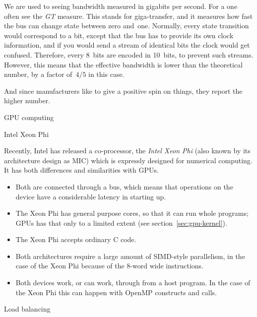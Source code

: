  We are used to seeing bandwidth
measured in gigabits per second. For a  one often
see the \emph{GT} measure. This stands
for giga-transfer, and it measures how fast the bus can change state
between zero and~one.
Normally, every state transition would correspond to a bit, except that
the bus has to provide its own clock information, and if you would send a stream
of identical bits the clock would get confused. Therefore, every 8~bits
are encoded in 10~bits, to prevent such streams. However, this means
that the effective bandwidth is lower than the theoretical number,
by a factor of~$4/5$ in this case.

And since manufacturers like to give a positive spin on things,
they report the higher number.

 {GPU computing}
\label{sec:gpu}


 {Intel Xeon Phi}

Recently, Intel has released a co-processor, the \emph{Intel Xeon Phi}
(also known by its architecture design as \ac{MIC})
which is expressly designed for numerical computing.
It has both differences and similarities with \acp{GPU}.
\begin{itemize}
\item Both are connected through a  bus, which means
  that operations on the device have a considerable latency in
  starting up.
\item The Xeon Phi has general purpose cores, so that it can run whole
  programs; \acp{GPU} has that only to a limited extent (see
  section~\ref{sec:gpu-kernel}).
\item The Xeon Phi accepts ordinary C code.
\item Both architectures require a large amount of SIMD-style
  parallelism, in the case of the Xeon Phi because of the 8-word wide
   instructions.
\item Both devices work, or can work, through 
  from a host program. In the case of the Xeon Phi this can happen
  with OpenMP constructs and  calls.
\end{itemize}


 {Load balancing}
\label{sec:load}

 

